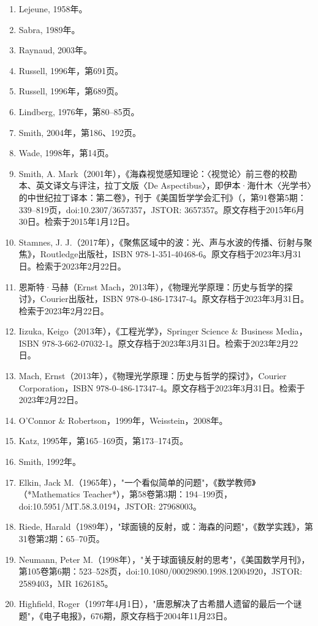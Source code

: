\begin{enumerate}
\item Lejeune, 1958年。
\item Sabra, 1989年。
\item Raynaud, 2003年。
\item Russell, 1996年，第691页。
\item Russell, 1996年，第689页。
\item Lindberg, 1976年，第80–85页。
\item Smith, 2004年，第186、192页。
\item Wade, 1998年，第14页。
\item Smith, A. Mark（2001年），《海森视觉感知理论：〈视觉论〉前三卷的校勘本、英文译文与评注，拉丁文版〈De Aspectibus〉，即伊本·海什木〈光学书〉的中世纪拉丁译本：第二卷》，刊于《美国哲学学会汇刊》（，第91卷第5期：339–819页，doi:10.2307/3657357，JSTOR: 3657357。原文存档于2015年6月30日。检索于2015年1月12日。
\item Stamnes, J. J.（2017年），《聚焦区域中的波：光、声与水波的传播、衍射与聚焦》，Routledge出版社，ISBN 978-1-351-40468-6。原文存档于2023年3月31日。检索于2023年2月22日。
\item 恩斯特·马赫（Ernst Mach，2013年），《物理光学原理：历史与哲学的探讨》，Courier出版社，ISBN 978-0-486-17347-4。原文存档于2023年3月31日。检索于2023年2月22日。
\item Iizuka, Keigo（2013年），《工程光学》，Springer Science & Business Media，ISBN 978-3-662-07032-1。原文存档于2023年3月31日。检索于2023年2月22日。
\item Mach, Ernst（2013年），《物理光学原理：历史与哲学的探讨》，Courier Corporation，ISBN 978-0-486-17347-4。原文存档于2023年3月31日。检索于2023年2月22日。
\item O'Connor & Robertson，1999年，Weisstein，2008年。
\item Katz, 1995年，第165–169页，第173–174页。
\item Smith, 1992年。
\item Elkin, Jack M.（1965年），"一个看似简单的问题"，《数学教师》（*Mathematics Teacher*），第58卷第3期：194–199页，doi:10.5951/MT.58.3.0194，JSTOR: 27968003。
\item Riede, Harald（1989年），"球面镜的反射，或：海森的问题"，《数学实践》，第31卷第2期：65–70页。
\item Neumann, Peter M.（1998年），"关于球面镜反射的思考"，《美国数学月刊》，第105卷第6期：523–528页，doi:10.1080/00029890.1998.12004920，JSTOR: 2589403，MR 1626185。
\item Highfield, Roger（1997年4月1日），"唐恩解决了古希腊人遗留的最后一个谜题"，《电子电报》，676期，原文存档于2004年11月23日。

\end{enumerate}
